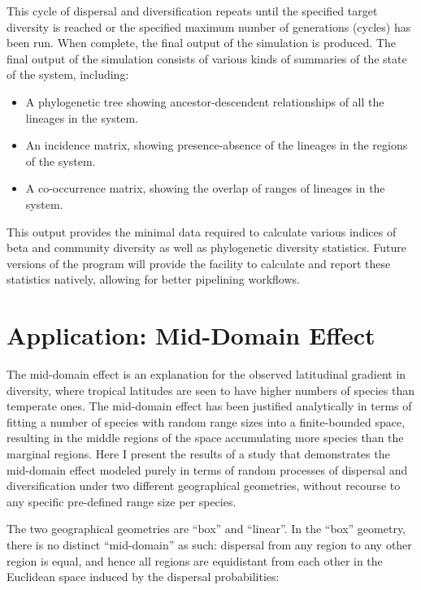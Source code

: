 \documentclass[11pt]{article}
\begin{document}
This cycle of dispersal and diversification repeats until the specified target diversity is reached or the specified maximum number of generations (cycles) has been run.
When complete, the final output of the simulation is produced.
The final output of the simulation consists of various kinds of summaries of the state of the system, including:

\begin{itemize}
	\item A phylogenetic tree showing ancestor-descendent relationships of all the lineages in the system.
	\item An incidence matrix, showing presence-absence of the lineages in the regions of the system.
	\item A co-occurrence matrix, showing the overlap of ranges of lineages in the system.
\end{itemize}

This output provides the minimal data required to calculate various indices of beta and community diversity as well as phylogenetic diversity statistics.
Future versions of the program will provide the facility to calculate and report these statistics natively, allowing for better pipelining workflows.

\section*{Application: Mid-Domain Effect}
The mid-domain effect is an explanation for the observed latitudinal gradient in diversity, where tropical latitudes are seen to have higher numbers of species than temperate ones.
The mid-domain effect has been justified analytically in terms of fitting a number of species with random range sizes into a finite-bounded space, resulting in the middle regions of the space accumulating more species than the marginal regions.
Here I present the results of a study that demonstrates the mid-domain effect modeled purely in terms of random processes of dispersal and diversification under two different geographical geometries, without recourse to any specific pre-defined range size per species.

The two geographical geometries are ``box'' and ``linear''.
In the ``box'' geometry, there is no distinct ``mid-domain'' as such: dispersal from any region to any other region is equal, and hence all regions are equidistant from each other in the Euclidean space induced by the dispersal probabilities:
\end{document}
